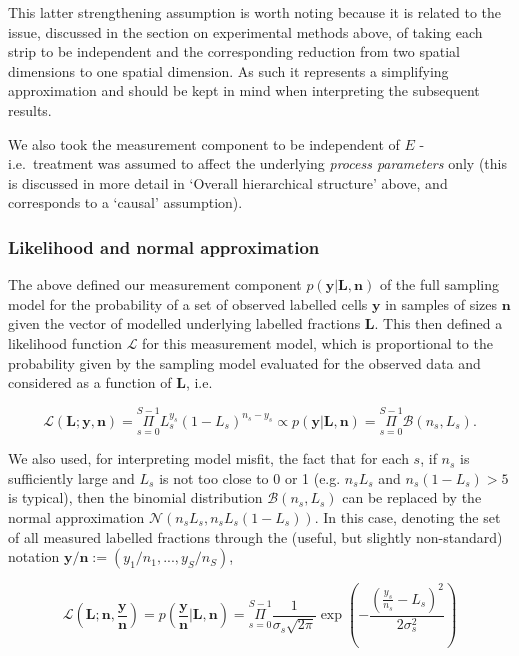 \documentclass[10pt,letterpaper]{article}
\begin{document}
This latter strengthening assumption is worth noting because it is
related to the issue, discussed in the section on experimental methods
above, of taking each strip to be independent and the corresponding
reduction from two spatial dimensions to one spatial dimension. As such
it represents a simplifying approximation and should be kept in mind
when interpreting the subsequent results.

We also took the measurement component to be independent of \(E\) -
i.e.~treatment was assumed to affect the underlying \emph{process
parameters} only (this is discussed in more detail in `Overall
hierarchical structure' above, and corresponds to a `causal'
assumption).

\subsubsection{Likelihood and normal
approximation}\label{likelihood-and-normal-approximation}

The above defined our measurement component
\(p(\mathbf{y}|\mathbf{L},\mathbf{n})\) of the full sampling model for
the probability of a set of observed labelled cells \(\mathbf{y}\) in
samples of sizes \(\mathbf{n}\) given the vector of modelled underlying
labelled fractions \(\mathbf{L}\). This then defined a likelihood
function \(\mathcal{L}\) for this measurement model, which is
proportional to the probability given by the sampling model evaluated
for the observed data and considered as a function of \(\mathbf{L}\),
i.e.

\begin{equation}\mathcal{L}(\mathbf{L};\mathbf{y},\mathbf{n}) = \underset{s=0}{\overset{S-1}{\Pi}}
L_s^{y_s}(1-L_s)^{n_s-y_s} \propto p(\mathbf{y}|\mathbf{L},\mathbf{n}) = \underset{s=0}{\overset{S-1}{\Pi}}\mathcal{B}(n_s,L_s).\label{eq:likel-binom}\end{equation}

We also used, for interpreting model misfit, the fact that for each
\(s\), if \(n_s\) is sufficiently large and \(L_s\) is not too close to
0 or 1 (e.g. \(n_sL_s\) and \(n_s(1-L_s) > 5\) is typical), then the
binomial distribution \(\mathcal{B}(n_s,L_s)\) can be replaced by the
normal approximation \(\mathcal{N}(n_sL_s,n_sL_s(1-L_s))\). In this
case, denoting the set of all measured labelled fractions through the
(useful, but slightly non-standard) notation
\(\mathbf{y}/\mathbf{n} := (y_1/n_1,...,y_S/n_S)\),

\begin{equation}\mathcal{L}(\mathbf{L};\mathbf{n},\frac{\mathbf{y}}{\mathbf{n}}) = p(\frac{\mathbf{y}}{\mathbf{n}}|\mathbf{L},\mathbf{n}) =
\underset{s=0}{\overset{S-1}{\Pi}} \frac{1}{\sigma_s
\sqrt{2\pi}}\exp{(-\frac{(\frac{y_s}{n_s}-L_s)^2}{2\sigma_s^2})}\label{eq:likel-norma}\end{equation}
\end{document}
